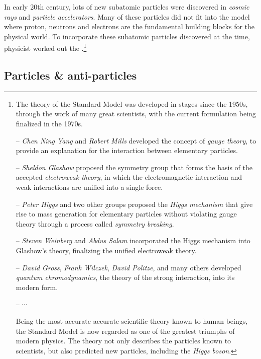 In early 20th century, lots of new subatomic particles were discovered in \emph{cosmic rays} and \emph{particle accelerators}. Many of these particles did not fit into the model where proton, neutrons and electrons are the fundamental building blocks for the physical world. To incorporate these subatomic particles discovered at the time, physicist worked out the .\footnote[][-3cm]{The theory of the Standard Model was developed in stages since the 1950s, through the work of many great scientists, with the current formulation being finalized in the 1970s.
	\begin{compactitem}
		\item[--] \emph{Chen Ning Yang} and \emph{Robert Mills} developed the concept of \emph{gauge theory}, to provide an explanation for the interaction between elementary particles.
		
		\item[--] \emph{Sheldon Glashow} proposed the symmetry group that forms the basis of the accepted \emph{electroweak theory}, in which the electromagnetic interaction and weak interactions are unified into a single force.
		
		\item[--] \emph{Peter Higgs} and two other groups proposed the \emph{Higgs mechanism} that give rise to mass generation for elementary particles without violating gauge theory through a process called \emph{symmetry breaking}.
		
		\item[--] \emph{Steven Weinberg} and \emph{Abdus Salam} incorporated the Higgs mechanism into Glashow's theory, finalizing the unified electroweak theory.
		
		\item[--] \emph{David Gross}, \emph{Frank Wilczek}, \emph{David Politze}, and many others developed \emph{quantum chromodynamics}, the theory of the strong interaction, into its modern form.
		
		\item[--] $\cdots$
	\end{compactitem}

Being the most accurate accurate scientific theory known to human beings, the Standard Model is now regarded as one of the greatest triumphs of modern physics. The theory not only describes the particles known to scientists, but also predicted new particles, including the \emph{Higgs boson}. }


\subsection{Particles \& anti-particles}

